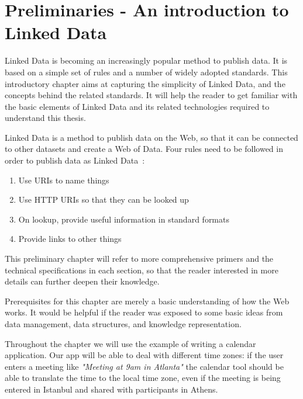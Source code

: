\chapter{Preliminaries - An introduction to Linked Data}


Linked Data is becoming an increasingly popular method to publish data.
It is based on a simple set of rules and a number of widely adopted standards.
This introductory chapter aims at capturing the simplicity of Linked Data, and the concepts behind the related standards.
It will help the reader to get familiar with the basic elements of Linked Data and its related technologies required to understand this thesis.

Linked Data is a method to publish data on the Web, so that it can be connected to other datasets and create a Web of Data.
Four rules need to be followed in order to publish data as Linked Data~\cite{linkeddata-rules}:

\begin{enumerate}
\item Use URIs to name things
\item Use HTTP URIs so that they can be looked up
\item On lookup, provide useful information in standard formats
\item Provide links to other things
\end{enumerate}

This preliminary chapter will refer to more comprehensive primers and the technical specifications in each section, so that the reader interested in more details can further deepen their knowledge.

Prerequisites for this chapter are merely a basic understanding of how the Web works.
It would be helpful if the reader was exposed to some basic ideas from data management, data structures, and knowledge representation.

Throughout the chapter we will use the example of writing a calendar application.
Our app will be able to deal with different time zones:
if the user enters a meeting like \textit{"Meeting at 9am in Atlanta"} the calendar tool should be able to translate the time to the local time zone, even if the meeting is being entered in Istanbul and shared with participants in Athens.

